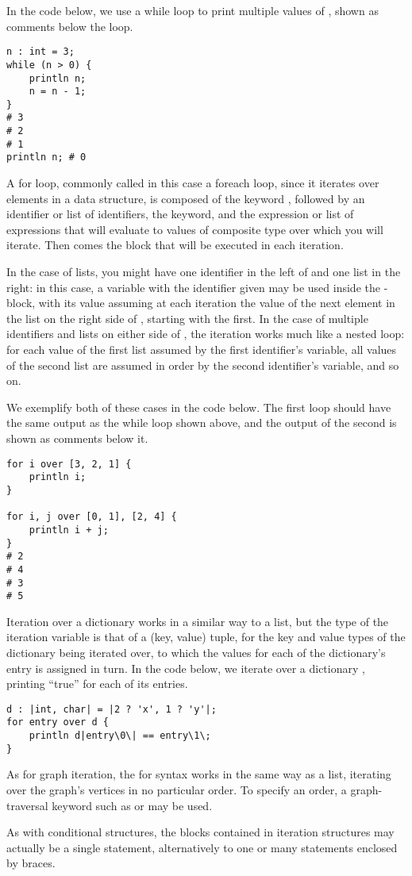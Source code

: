 In the code below, we use a while loop to print multiple values of , shown as comments below the loop.
\begin{lstlisting}[language=Gryph]
n : int = 3;
while (n > 0) {
	println n;
	n = n - 1;
}
# 3
# 2
# 1
println n; # 0
\end{lstlisting}

A for loop, commonly called in this case a foreach loop, since it iterates over elements in a data structure, is composed of the keyword , followed by an identifier or list of identifiers, the  keyword, and the expression or list of expressions that will evaluate to values of composite type over which you will iterate. Then comes the block that will be executed in each iteration.

In the case of lists, you might have one identifier in the left of  and one list in the right: in this case, a variable with the identifier given may be used inside the -block, with its value assuming at each iteration the value of the next element in the list on the right side of , starting with the first. In the case of multiple identifiers and lists on either side of , the iteration works much like a nested loop: for each value of the first list assumed by the first identifier's variable, all values of the second list are assumed in order by the second identifier's variable, and so on.

We exemplify both of these cases in the code below. The first loop should have the same output as the while loop shown above, and the output of the second is shown as comments below it.
\begin{lstlisting}[language=Gryph]
for i over [3, 2, 1] {
	println i;
}

for i, j over [0, 1], [2, 4] {
	println i + j;
}
# 2 
# 4 
# 3 
# 5 
\end{lstlisting}

Iteration over a dictionary works in a similar way to a list, but the type of the iteration variable is that of a (key, value) tuple, for the key and value types of the dictionary being iterated over, to which the values for each of the dictionary's entry is assigned in turn. In the code below, we iterate over a dictionary , printing ``true'' for each of its entries.

\begin{lstlisting}[language=Gryph]
d : |int, char| = |2 ? 'x', 1 ? 'y'|;
for entry over d {
	println d|entry\0\| == entry\1\;
}
\end{lstlisting}

As for graph iteration, the for syntax works in the same way as a list, iterating over the graph's vertices in no particular order. To specify an order, a graph-traversal keyword such as  or  may be used.


As with conditional structures, the blocks contained in iteration structures may actually be a single statement, alternatively to one or many statements enclosed by braces.